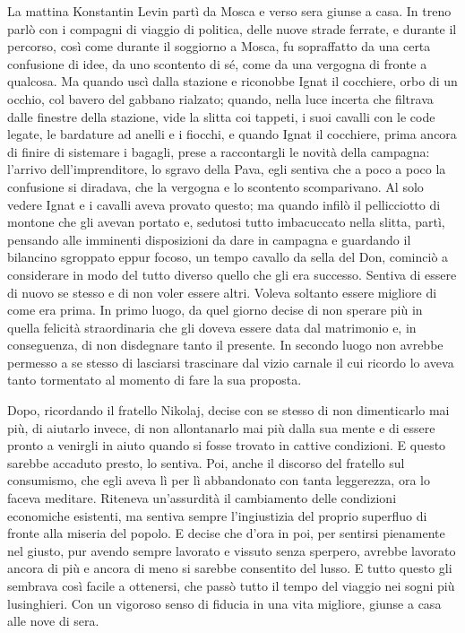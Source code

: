 La mattina Konstantin Levin partì da Mosca e verso sera giunse a casa. In treno parlò con i compagni di viaggio di politica, delle nuove strade ferrate, e durante il percorso, così come durante il soggiorno a Mosca, fu sopraffatto da una certa confusione di idee, da uno scontento di sé, come da una vergogna di fronte a qualcosa. Ma quando uscì dalla stazione e riconobbe Ignat il cocchiere, orbo di un occhio, col bavero del gabbano rialzato; quando, nella luce incerta che filtrava dalle finestre della stazione, vide la slitta coi tappeti, i suoi cavalli con le code legate, le bardature ad anelli e i fiocchi, e quando Ignat il cocchiere, prima ancora di finire di sistemare i bagagli, prese a raccontargli le novità della campagna: l'arrivo dell'imprenditore, lo sgravo della Pava, egli sentiva che a poco a poco la confusione si diradava, che la vergogna e lo scontento scomparivano. Al solo vedere Ignat e i cavalli aveva provato questo; ma quando infilò il pellicciotto di montone che gli avevan portato e, sedutosi tutto imbacuccato nella slitta, partì, pensando alle imminenti disposizioni da dare in campagna e guardando il bilancino sgroppato eppur focoso, un tempo cavallo da sella del Don, cominciò a considerare in modo del tutto diverso quello che gli era successo. Sentiva di essere di nuovo se stesso e di non voler essere altri. Voleva soltanto essere migliore di come era prima. In primo luogo, da quel giorno decise di non sperare più in quella felicità straordinaria che gli doveva essere data dal matrimonio e, in conseguenza, di non disdegnare tanto il presente. In secondo luogo non avrebbe permesso a se stesso di lasciarsi trascinare dal vizio carnale il cui ricordo lo aveva tanto tormentato al momento di fare la sua proposta. 

Dopo, ricordando il fratello Nikolaj, decise con se stesso di non dimenticarlo mai più, di aiutarlo invece, di non allontanarlo mai più dalla sua mente e di essere pronto a venirgli in aiuto quando si fosse trovato in cattive condizioni. E questo sarebbe accaduto presto, lo sentiva. Poi, anche il discorso del fratello sul consumismo, che egli aveva lì per lì abbandonato con tanta leggerezza, ora lo faceva meditare. Riteneva un'assurdità il cambiamento delle condizioni economiche esistenti, ma sentiva sempre l'ingiustizia del proprio superfluo di fronte alla miseria del popolo. E decise che d'ora in poi, per sentirsi pienamente nel giusto, pur avendo sempre lavorato e vissuto senza sperpero, avrebbe lavorato ancora di più e ancora di meno si sarebbe consentito del lusso. E tutto questo gli sembrava così facile a ottenersi, che passò tutto il tempo del viaggio nei sogni più lusinghieri. Con un vigoroso senso di fiducia in una vita migliore, giunse a casa alle nove di sera. 

